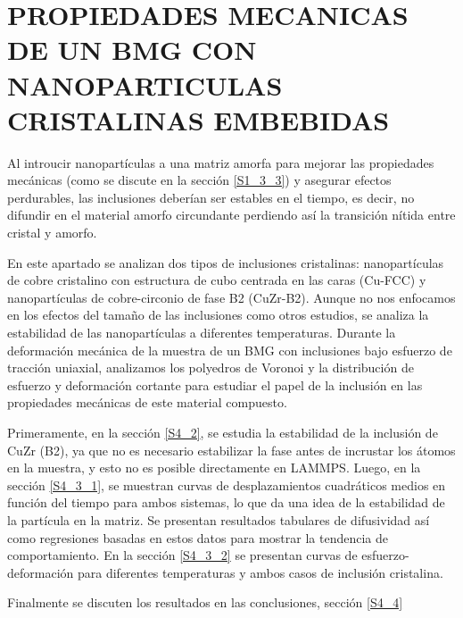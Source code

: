 
\chapter{PROPIEDADES MECANICAS DE UN BMG CON NANOPARTICULAS CRISTALINAS EMBEBIDAS} %

\label{C4} %


Al introucir nanopartículas a una matriz amorfa para mejorar las propiedades mecánicas (como se discute en la sección \ref{S1_3_3}) y asegurar efectos perdurables, las inclusiones deberían ser estables en el tiempo, es decir, no difundir en el material amorfo circundante perdiendo así la transición nítida entre cristal y amorfo.

En este apartado se analizan dos tipos de inclusiones cristalinas: nanopartículas de cobre cristalino con estructura de cubo centrada en las caras (Cu-FCC) y nanopartículas de cobre-circonio de fase B2 (CuZr-B2). Aunque no nos enfocamos en los efectos del tamaño de las inclusiones como otros estudios, se analiza la estabilidad de las nanopartículas a diferentes temperaturas. Durante la deformación mecánica de la muestra de un BMG con inclusiones bajo esfuerzo de tracción uniaxial, analizamos los polyedros de Voronoi y la distribución de esfuerzo y deformación cortante para estudiar el papel de la inclusión en las propiedades mecánicas de este material compuesto.

Primeramente, en la sección \ref{S4_2}, se estudia la estabilidad de la inclusión de CuZr (B2), ya que no es necesario estabilizar la fase antes de incrustar los átomos en la muestra, y esto no es posible directamente en LAMMPS. Luego, en la sección \ref{S4_3_1}, se muestran curvas de desplazamientos cuadráticos medios en función del tiempo para ambos sistemas, lo que da una idea de la estabilidad de la partícula en la matriz. Se presentan resultados tabulares de difusividad así como regresiones basadas en estos datos para mostrar la tendencia de comportamiento. En la sección \ref{S4_3_2} se presentan curvas de esfuerzo-deformación para diferentes temperaturas y ambos casos de inclusión cristalina.

Finalmente se discuten los resultados en las conclusiones, sección \ref{S4_4}


